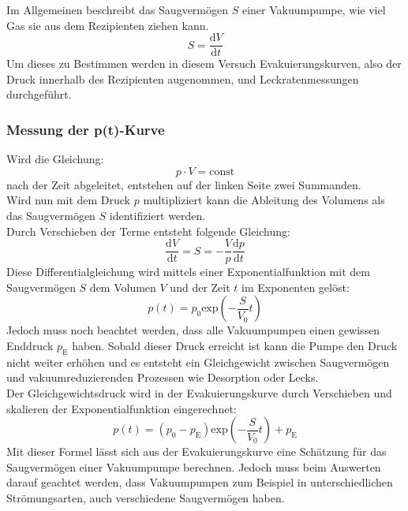 			\noindent
		Im Allgemeinen beschreibt das Saugvermögen $S$ einer Vakuumpumpe, wie viel Gas sie aus dem Rezipienten ziehen kann. 
		\begin{equation}
			S = \frac{\text{d}V}{\text{d}t}
		\end{equation}
		Um dieses zu Bestimmen werden in diesem Versuch Evakuierungskurven, also der Druck innerhalb des Rezipienten augenommen, und Leckratenmessungen durchgeführt.

		\subsubsection{Messung der p(t)-Kurve}
			
			\noindent
			Wird die Gleichung:
			\begin{equation}
				p \cdot V = \text{const}
			\end{equation}
			nach der Zeit abgeleitet, entstehen auf der linken Seite zwei Summanden. \\
			Wird nun mit dem Druck $p$ multipliziert kann die Ableitung des Volumens als das Saugvermögen $S$ identifiziert werden.\\
			Durch Verschieben der Terme entsteht folgende Gleichung:
			\begin{equation}
				\frac{\text{d}V}{\text{d}t} = S = - \frac{V}{p} \frac{\text{d}p}{\text{d}t}
			\end{equation}
			Diese Differentialgleichung wird mittels einer Exponentialfunktion mit dem Saugvermögen $S$ dem Volumen $V$ und der Zeit $t$ im Exponenten gelöst:
			\begin{equation}
				p(t) = p_0 \text{exp}\left( - \frac{S}{V_0}t \right)
			\end{equation}
			Jedoch muss noch beachtet werden, dass alle Vakuumpumpen einen gewissen Enddruck $p_\text{E}$ haben. 
			Sobald dieser Druck erreicht ist kann die Pumpe den Druck nicht weiter erhöhen und es entsteht ein Gleichgewicht zwischen Saugvermögen und 
			vakuumreduzierenden Prozessen wie Desorption oder Lecks.\\
			Der Gleichgewichtsdruck wird in der Evakuierungskurve durch Verschieben und skalieren der Exponentialfunktion eingerechnet:
			\begin{equation}
				p(t) = (p_0 - p_\text{E}) \text{exp}\left( - \frac{S}{V_0}t \right) + p_\text{E}
				\label{eqn:druckkurve}
			\end{equation}
			Mit dieser Formel lässt sich aus der Evakuierungskurve eine Schätzung für das Saugvermögen einer Vakuumpumpe berechnen.
			Jedoch muss beim Auswerten darauf geachtet werden, dass Vakuumpumpen zum Beispiel in unterschiedlichen Strömungsarten, auch verschiedene Saugvermögen haben.
			
